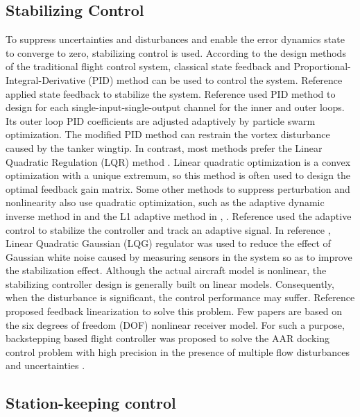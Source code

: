 \subsection{Stabilizing Control}

To suppress uncertainties and disturbances and enable the error dynamics
state to converge to zero, stabilizing control is used. According
to the design methods of the traditional flight control system, classical
state feedback and Proportional-Integral-Derivative (PID) method can
be used to control the system. Reference \cite{ochi2005flight} applied
state feedback to stabilize the system. Reference \cite{li2010uav}
used PID method to design for each single-input-single-output channel
for the inner and outer loops. Its outer loop PID coefficients are
adjusted adaptively by particle swarm optimization. The modified PID
method can restrain the vortex disturbance caused by the tanker wingtip.
In contrast, most methods prefer the Linear Quadratic Regulation (LQR)
method \cite{valasek2002vision} \cite{kimmett2002vision} \cite{tandale2006trajectory}
\cite{fravolini2004modeling} \cite{rehan2012robust} \cite{wang2011precise}.
Linear quadratic optimization is a convex optimization with a unique
extremum, so this method is often used to design the optimal feedback
gain matrix. Some other methods to suppress perturbation and nonlinearity
also use quadratic optimization, such as the adaptive dynamic inverse
method in \cite{gai2012trajectory} and the L1 adaptive method in
\cite{wang2010verifiable}, \cite{wang2008novel}. Reference \cite{stepanyan2004aerial}
used the adaptive control to stabilize the controller and track an
adaptive signal. In reference \cite{kimmett2002autonomous}, Linear
Quadratic Gaussian (LQG) regulator was used to reduce the effect of
Gaussian white noise caused by measuring sensors in the system so
as to improve the stabilization effect. Although the actual aircraft
model is nonlinear, the stabilizing controller design is generally
built on linear models. Consequently, when the disturbance is significant,
the control performance may suffer. Reference \cite{elliott2010investigating}
proposed feedback linearization to solve this problem. Few papers
are based on the six degrees of freedom (DOF) nonlinear receiver model.
For such a purpose, backstepping based flight controller was proposed
to solve the AAR docking control problem with high precision in the
presence of multiple flow disturbances and uncertainties \cite{su2018exact}\cite{su2018probe}. 

\subsection{Station-keeping control}

